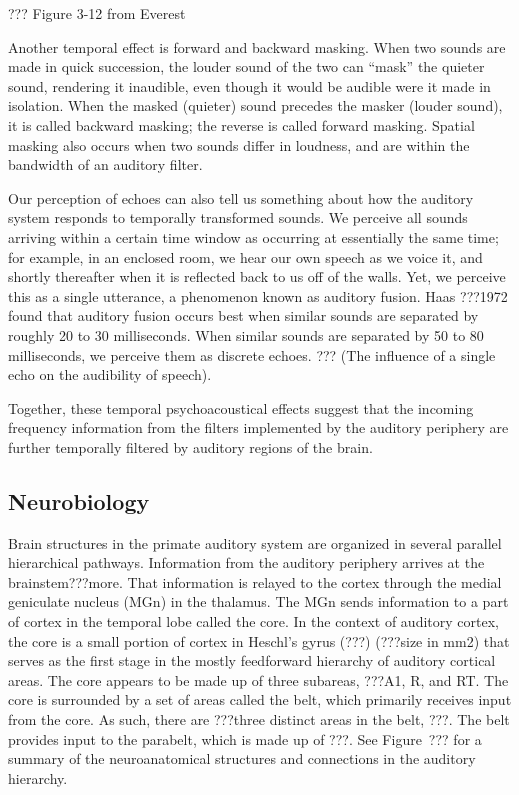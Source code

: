 ??? Figure 3-12 from Everest

Another temporal effect is forward and backward masking.
When two sounds are made in quick succession,
the louder sound of the two can
``mask'' the quieter sound,
rendering it inaudible,
even though it would be audible
were it made in isolation.
When the masked (quieter) sound
precedes the masker (louder sound),
it is called backward masking;
the reverse is called forward masking.
Spatial masking also occurs
when two sounds differ in loudness,
and are within the bandwidth
of an auditory filter.

Our perception of echoes can also tell us
something about how the auditory system
responds to temporally transformed sounds.
We perceive all sounds arriving within
a certain time window as occurring at essentially
the same time;
for example, in an enclosed room,
we hear our own speech as we voice it,
and shortly thereafter when it is reflected
back to us off of the walls.
Yet, we perceive this as a single utterance,
a phenomenon known as auditory fusion.
Haas ???1972 found that auditory fusion occurs
best when similar sounds are separated by roughly
20 to 30 milliseconds.
When similar sounds are separated by 50 to 80 milliseconds,
we perceive them as discrete echoes.
??? (The influence of a single echo on the audibility of speech).

Together, these temporal psychoacoustical effects
suggest that the incoming frequency information
from the filters implemented by the auditory periphery
are further temporally filtered
by auditory regions of the brain.


\subsection{Neurobiology}

Brain structures in the primate auditory system
are organized in several parallel
hierarchical pathways.
Information from the auditory periphery
arrives at the brainstem???more.
That information is relayed to the cortex
through the medial geniculate nucleus (MGn)
in the thalamus.
The MGn sends information to a part
of cortex in the temporal lobe
called the core.
In the context of auditory cortex,
the core is a small portion of cortex
in Heschl's gyrus (???)
(???size in mm2)
that serves as the first stage
in the mostly feedforward hierarchy
of auditory cortical areas.
The core appears to be made up of
three subareas, ???A1, R, and RT.
The core is surrounded by a set of areas
called the belt,
which primarily receives input from
the core.
As such, there are ???three
distinct areas in the belt,
???.
The belt provides input
to the parabelt,
which is made up of ???.
See Figure~??? for a summary of
the neuroanatomical structures and connections
in the auditory hierarchy.

